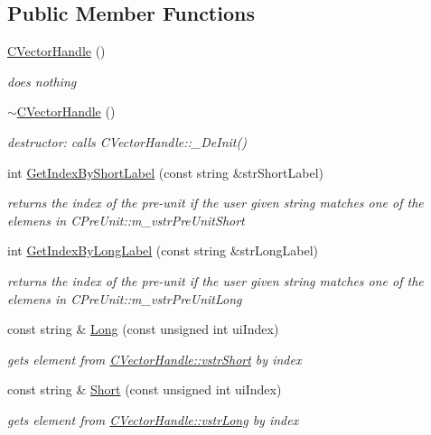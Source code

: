 \subsection*{Public Member Functions}
\begin{DoxyCompactItemize}
\item 
\hyperlink{classCVectorHandle_ac6b74f660515541066f809b1339b2fdd}{C\+Vector\+Handle} ()
\begin{DoxyCompactList}\small\item\em does nothing \end{DoxyCompactList}\item 
\hyperlink{classCVectorHandle_a74e5aee7e24867695dafa409ab39a379}{$\sim$\+C\+Vector\+Handle} ()
\begin{DoxyCompactList}\small\item\em destructor\+: calls C\+Vector\+Handle\+::\+\_\+\+De\+Init() \end{DoxyCompactList}\item 
int \hyperlink{classCVectorHandle_ab1c2a8cb7d2f87077c6be60a86e2ae16}{Get\+Index\+By\+Short\+Label} (const string \&str\+Short\+Label)
\begin{DoxyCompactList}\small\item\em returns the index of the pre-\/unit if the user given string matches one of the elemens in C\+Pre\+Unit\+::m\+\_\+vstr\+Pre\+Unit\+Short \end{DoxyCompactList}\item 
int \hyperlink{classCVectorHandle_a36419c6f77002dde25bfa9e43357bd5c}{Get\+Index\+By\+Long\+Label} (const string \&str\+Long\+Label)
\begin{DoxyCompactList}\small\item\em returns the index of the pre-\/unit if the user given string matches one of the elemens in C\+Pre\+Unit\+::m\+\_\+vstr\+Pre\+Unit\+Long \end{DoxyCompactList}\item 
const string \& \hyperlink{classCVectorHandle_a392678513c7224a67022720797ac7b1b}{Long} (const unsigned int ui\+Index)
\begin{DoxyCompactList}\small\item\em gets element from \hyperlink{classCVectorHandle_afb50c8a33d4cf70bf92c644dca409ea2}{C\+Vector\+Handle\+::vstr\+Short} by index \end{DoxyCompactList}\item 
const string \& \hyperlink{classCVectorHandle_ac26fa8d3b66a5cc88dea0b411f5e20de}{Short} (const unsigned int ui\+Index)
\begin{DoxyCompactList}\small\item\em gets element from \hyperlink{classCVectorHandle_a71bec0e385b9ca8e5ffa174b559da9f8}{C\+Vector\+Handle\+::vstr\+Long} by index \end{DoxyCompactList}\item 

\end{DoxyCompactItemize}
